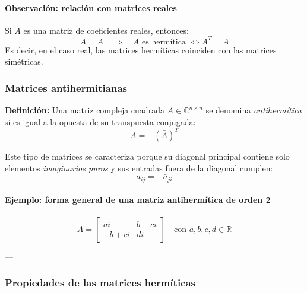 \paragraph{Observación: relación con matrices reales}

Si \(A\) es una matriz de coeficientes reales, entonces:
\[
\bar{A} = A \quad \Rightarrow \quad A \text{ es hermítica } \Leftrightarrow A^T = A
\]
Es decir, en el caso real, las matrices hermíticas coinciden con las matrices simétricas.

\subsubsection{Matrices antihermitianas}

\textbf{Definición:}  
Una matriz compleja cuadrada \(A \in \mathbb{C}^{n \times n}\) se denomina \textit{antihermítica} si es igual a la opuesta de su transpuesta conjugada:
\[
A = -(\bar{A})^T
\]

Este tipo de matrices se caracteriza porque su diagonal principal contiene solo elementos \textit{imaginarios puros} y sus entradas fuera de la diagonal cumplen:
\[
a_{ij} = -\bar{a}_{ji}
\]

\paragraph{Ejemplo: forma general de una matriz antihermítica de orden 2}

\[
A = \begin{bmatrix}
ai & b + ci \\
- b + ci & di
\end{bmatrix}
\quad \text{con } a, b, c, d \in \mathbb{R}
\]

---

\subsubsection{Propiedades de las matrices hermíticas}

